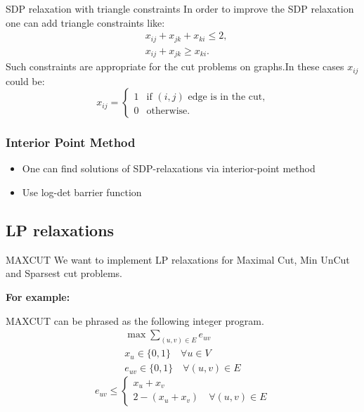 \documentclass[10pt]{beamer}
\begin{document}
        \begin{frame}{SDP relaxation with triangle constraints}
            In order to improve the SDP relaxation one can add triangle constraints like:
            \begin{align*}
                &x_{ij} + x_{jk} + x_{ki} \leq 2, \\
                &x_{ij} + x_{jk} \geq x_{ki}.
            \end{align*}
            Such constraints are appropriate for the cut problems on graphs.In these cases $x_{ij}$ could be:
            \[
                x_{ij} = \begin{cases} 1 & \text{if } (i, j) \text{ edge is in the cut,} \\ 
                0 & \text{otherwise.}\end{cases}
            \]
            
        \end{frame}

	\begin{frame}
		\frametitle{Interior Point Method}
		
		\begin{itemize}
			\item One can find solutions of SDP-relaxations via interior-point method
			\item Use log-det barrier function
		\end{itemize}
		
	\end{frame}
	
	\subsection{LP relaxations}
        \begin{frame}{MAXCUT}
            We want to implement LP relaxations for Maximal Cut, Min UnCut and Sparsest cut problems.
            
            \textbf{For example:} 
            
            MAXCUT can be phrased as the following integer program.
            \begin{align*}
                \max \sum\limits_{(u,v) \in E} e_{uv} \\
                x_u \in \{0,1\} \quad \forall u \in V\\
                e_{uv} \in \{0,1\} \quad \forall (u,v) \in E
            \end{align*}
            \begin{equation*}
                e_{uv} \le 
                \begin{cases}
                    x_u + x_v \\
                    2 - (x_u + x_v) \quad \forall (u,v) \in E
                \end{cases}
            \end{equation*}
            
        \end{frame}  
        
\end{document}
